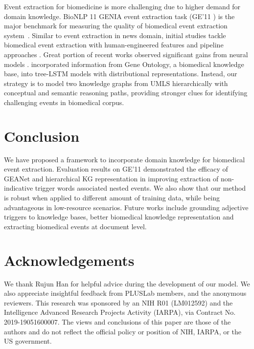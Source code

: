 \documentclass[11pt,a4paper]{article}
\makeatletter
\newcommand{\GAENet}{\textrm{GEANet}}
\newcommand{\GE}{\textrm{{\fontfamily{qcr}\selectfont GE'11} }}
\renewcommand\paragraph{\@startsection{paragraph}{4}{\z@}{.25ex \@plus.5ex \@minus.2ex}{-1em}{\normalfont\normalsize\bfseries}}
\makeatother
\begin{document}
\paragraph{Biomedial Event Extraction}
Event extraction for biomedicine is more challenging due to higher demand for domain knowledge. BioNLP 11 GENIA event extraction task (\GE) is the major benchmark for measuring the quality of biomedical event extraction system~\cite{kim2011overview}. Similar to event extraction in news domain, initial studies tackle biomedical event extraction with human-engineered features and pipeline approaches \cite{miwa2012boosting, bjorne-salakoski-2011-generalizing}. Great portion of recent works observed significant gains from neural models \cite{venugopal-etal-2014-relieving, rao-etal-2017-biomedical, jagannatha-yu-2016-bidirectional, bjorne-salakoski-2018-biomedical}.  incorporated information from Gene Ontology, a biomedical knowledge base, into tree-LSTM models with distributional representations. Instead, our strategy is to model two knowledge graphs from UMLS hierarchically with conceptual and semantic reasoning paths, providing stronger clues for identifying challenging events in biomedical corpus. \section{Conclusion}
We have proposed a framework to incorporate domain knowledge for biomedical event extraction. Evaluation results on \GE{} demonstrated the efficacy of \GAENet{} and hierarchical KG representation in improving extraction of non-indicative trigger words associated nested events. We also show that our method is robust when applied to different amount of training data, while being advantageous in low-resource scenarios.  Future works include grounding adjective triggers to knowledge bases, better biomedical knowledge representation and extracting biomedical events at document level. 
\section*{Acknowledgements}
We thank Rujun Han for helpful advice during the development of our model. We also appreciate insightful feedback from PLUSLab members, and the anonymous reviewers. This research was sponsored by an NIH R01 (LM012592) and the Intelligence Advanced Research Projects Activity (IARPA), via Contract No. 2019-19051600007. The views and conclusions of this paper are those of the authors and do not reflect the official policy or position of NIH, IARPA, or the US government. 


\end{document}
